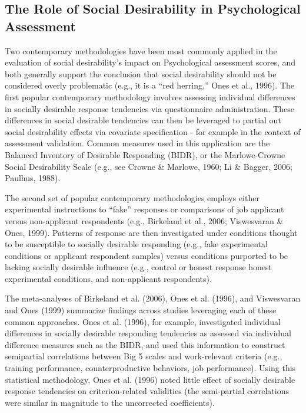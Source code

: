 \documentclass[
  ,jou]{apa6}
\begin{document}
\hypertarget{the-role-of-social-desirability-in-psychological-assessment}{%
\subsection{The Role of Social Desirability in Psychological Assessment}\label{the-role-of-social-desirability-in-psychological-assessment}}

Two contemporary methodologies have been most commonly applied in the evaluation of social desirability's impact on Psychological assessment scores, and both generally support the conclusion that social desirability should not be considered overly problematic (e.g., it is a ``red herring,'' Ones et al., 1996). The first popular contemporary methodology involves assessing individual differences in socially desirable response tendencies via questionnaire administration. These differences in social desirable tendencies can then be leveraged to partial out social desirability effects via covariate specification - for example in the context of assessment validation. Common measures used in this application are the Balanced Inventory of Desirable Responding (BIDR), or the Marlowe-Crowne Social Desirability Scale (e.g., see Crowne \& Marlowe, 1960; Li \& Bagger, 2006; Paulhus, 1988).

The second set of popular contemporary methodologies employs either experimental instructions to ``fake'' responses or comparisons of job applicant versus non-applicant respondents (e.g., Birkeland et al., 2006; Viswesvaran \& Ones, 1999). Patterns of response are then investigated under conditions thought to be susceptible to socially desirable responding (e.g., fake experimental conditions or applicant respondent samples) versus conditions purported to be lacking socially desirable influence (e.g., control or honest response honest experimental conditions, and non-applicant respondents).

The meta-analyses of Birkeland et al. (2006), Ones et al. (1996), and Viswesvaran and Ones (1999) summarize findings across studies leveraging each of these common approaches. Ones et al. (1996), for example, investigated individual differences in socially desirable responding tendencies as assessed via individual difference measures such as the BIDR, and used this information to construct semipartial correlations between Big 5 scales and work-relevant criteria (e.g., training performance, counterproductive behaviors, job performance). Using this statistical methodology, Ones et al. (1996) noted little effect of socially desirable response tendencies on criterion-related validities (the semi-partial correlations were similar in magnitude to the uncorrected coefficients).
\end{document}
